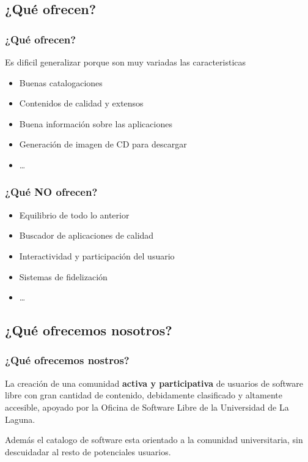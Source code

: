 	
	\subsection{¿Qué ofrecen?} %
	\begin{frame}
		\frametitle{¿Qué ofrecen?}
		Es dificil generalizar porque son muy variadas las caracteristicas\ldtos
		\begin{itemize}
			\item <1-| alert@1> Buenas catalogaciones
			\item <2-| alert@2> Contenidos de calidad y extensos
			\item <3-| alert@3> Buena información sobre las aplicaciones
			\item <4-| alert@4> Generación de imagen de CD para descargar
			\item <5-| alert@5> \ldots
		\end{itemize}
	\end{frame}

	\begin{frame}
		\frametitle{¿Qué NO ofrecen?}
		\setbeamercovered{invisible}
		\begin{itemize}
			\item <1-| alert@1> Equilibrio de todo lo anterior
			\item <2-| alert@2> Buscador de aplicaciones de calidad
			\item <3-| alert@3> Interactividad y participación del usuario
			\item <4-| alert@4> Sistemas de fidelización
			\item <5-| alert@5> \ldots
		\end{itemize}
	\end{frame}


	\subsection{¿Qué ofrecemos nosotros?} %
	\begin{frame}
		\frametitle{¿Qué ofrecemos nostros?}
		La creación de una comunidad \textbf{activa y participativa} de usuarios de software libre con gran cantidad de contenido, debidamente clasificado y altamente accesible, apoyado por la Oficina de Software Libre de la Universidad de La Laguna.

		Además el catalogo de software esta orientado a la comunidad universitaria, sin descuidadar al resto de potenciales usuarios.
	\end{frame}